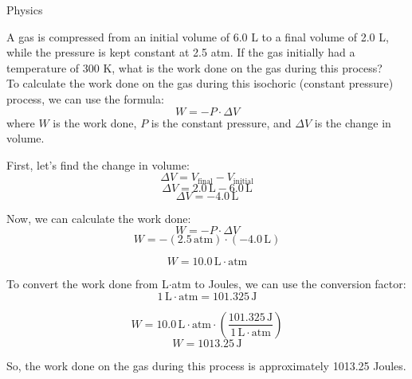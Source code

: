 \begin{AIBoxBreak}{Physics}

	\usermsg A gas is compressed from an initial volume of 6.0 L to a final volume of 2.0 L, while the pressure is kept constant at 2.5 atm. If the gas initially had a temperature of 300 K, what is the work done on the gas during this process?\\

	\assistantmsg To calculate the work done on the gas during this isochoric (constant pressure) process, we can use the formula:
	\[
		W = -P \cdot \Delta V
	\]
	where $W$ is the work done, $P$ is the constant pressure, and $\Delta V$ is the change in volume.

	First, let's find the change in volume:
	\[
		\Delta V = V_{\text{final}} - V_{\text{initial}}
	\]
	\[
		\Delta V = 2.0 \, \text{L} - 6.0 \, \text{L}
	\]
	\[
		\Delta V = -4.0 \, \text{L}
	\]

	Now, we can calculate the work done:
	\[
		W = -P \cdot \Delta V
	\]
	\[
		W = -(2.5 \, \text{atm}) \cdot (-4.0 \, \text{L})
	\]

	\[
		W = 10.0 \, \text{L} \cdot \text{atm}
	\]

	To convert the work done from L$\cdot$atm to Joules, we can use the conversion factor:
	\[
		1 \, \text{L} \cdot \text{atm} = 101.325 \, \text{J}
	\]

	\[
		W = 10.0 \, \text{L} \cdot \text{atm} \cdot \left(\frac{101.325 \, \text{J}}{1 \, \text{L} \cdot \text{atm}}\right)
	\]
	\[
		W = 1013.25 \, \text{J}
	\]

	So, the work done on the gas during this process is approximately 1013.25 Joules.

\end{AIBoxBreak}


